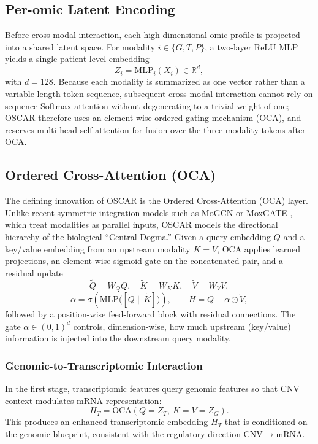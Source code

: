 \documentclass[lettersize,journal]{IEEEtran}
\begin{document}
\subsection{Per-omic Latent Encoding}
Before cross-modal interaction, each high-dimensional omic profile is projected into a shared latent space. For modality $i \in \{G, T, P\}$, a two-layer ReLU MLP yields a single patient-level embedding
\begin{equation}
    Z_i = \mathrm{MLP}_i(X_i) \in \mathbb{R}^{d},
\end{equation}
with $d=128$. Because each modality is summarized as one vector rather than a variable-length token sequence, subsequent cross-modal interaction cannot rely on sequence Softmax attention without degenerating to a trivial weight of one; OSCAR therefore uses an element-wise ordered gating mechanism (OCA), and reserves multi-head self-attention for fusion over the three modality tokens after OCA.

\subsection{Ordered Cross-Attention (OCA)}
The defining innovation of OSCAR is the Ordered Cross-Attention (OCA) layer. Unlike recent symmetric integration models such as MoGCN \cite{MoGCN2022} or MoxGATE \cite{MoxGATE2023}, which treat modalities as parallel inputs, OSCAR models the directional hierarchy of the biological ``Central Dogma.''
Given a query embedding $Q$ and a key/value embedding from an upstream modality $K{=}V$, OCA applies learned projections, an element-wise sigmoid gate on the concatenated pair, and a residual update
\begin{equation}
    \tilde{Q}=W_Q Q,\quad \tilde{K}=W_K K,\quad \tilde{V}=W_V V,
\end{equation}
\begin{equation}
    \alpha = \sigma\!\left(\mathrm{MLP}\big([\tilde{Q}\parallel\tilde{K}]\big)\right),\qquad
    H = \tilde{Q} + \alpha \odot \tilde{V},
\end{equation}
followed by a position-wise feed-forward block with residual connections. The gate $\alpha \in (0,1)^{d}$ controls, dimension-wise, how much upstream (key/value) information is injected into the downstream query modality.

\subsubsection{Genomic-to-Transcriptomic Interaction}
In the first stage, transcriptomic features query genomic features so that CNV context modulates mRNA representation:
\begin{equation}
    H_T = \mathrm{OCA}(Q=Z_T,\ K{=}V=Z_G).
\end{equation}
This produces an enhanced transcriptomic embedding $H_T$ that is conditioned on the genomic blueprint, consistent with the regulatory direction $\mathrm{CNV}\rightarrow\mathrm{mRNA}$.
\end{document}
